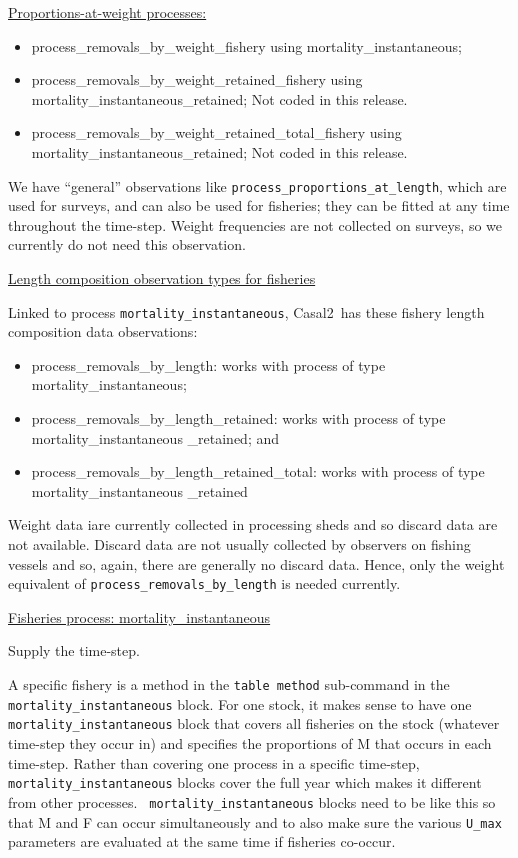 \documentclass[a4paper,11pt,twoside,pdftex,draft]{article}
\newcommand{\CNAME}{Casal2}
\begin{document}
\bigskip
\underline{Proportions-at-weight processes:}

\begin{itemize}
	\item process\_removals\_by\_weight\_fishery using mortality\_instantaneous;
	\item process\_removals\_by\_weight\_retained\_fishery using mortality\_instantaneous\_retained; Not coded in this release.
	\item process\_removals\_by\_weight\_retained\_total\_fishery using mortality\_instantaneous\_retained;  Not coded in this release.
\end{itemize}


We have ``general'' observations like \texttt{process\_proportions\_at\_length}, which are used for surveys, and can also be used for fisheries; they can be fitted at any time throughout the time-step. Weight frequencies are not collected on surveys, so we currently do not need this observation.

\bigskip
\underline{Length composition observation types for fisheries}

Linked to process \texttt{mortality\_instantaneous}, \CNAME~has these fishery length composition data observations:

\begin{itemize}
	\item process\_removals\_by\_length: works with process of type mortality\_instantaneous;
	\item process\_removals\_by\_length\_retained: works with process of type mortality\_instantaneous \_retained; and
	\item process\_removals\_by\_length\_retained\_total: works with process of type mortality\_instantaneous \_retained
\end{itemize}

Weight data iare currently collected in processing sheds and so discard data are not available. Discard data are not usually collected by observers on fishing vessels and so, again, there are generally no discard data. Hence, only the weight equivalent of \texttt{process\_removals\_by\_length} is needed currently.


\bigskip
\underline{Fisheries process: mortality\_instantaneous}

Supply the time-step.

A specific fishery is a method in the \texttt{table method} sub-command in the   \texttt{mortality\_instantaneous} block. For one stock, it makes sense to have one \texttt{mortality\_instantaneous} block that covers all fisheries on the stock (whatever time-step they occur in) and specifies the proportions of M that occurs in each time-step. Rather than covering one process in a specific time-step, \texttt{mortality\_instantaneous} blocks cover the full year which makes it different from other processes. \texttt{ mortality\_instantaneous} blocks need to be like this so that M and F can occur simultaneously and to also make sure the various \texttt{U\_max} parameters are evaluated at the same time if fisheries co-occur.
\end{document}
